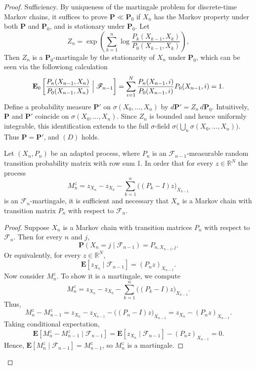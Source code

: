 \documentclass[10pt,a4paper]{amsart}
\begin{document}
\begin{proof} Sufficiency. By uniqueness of the martingale problem for discrete-time Markov chains, it suffices to prove $\mathbf P \ll \mathbf P_0$ if $X_n$ has the Markov property under both $\mathbf P$ and $\mathbf P_0$, and is stationary under $\mathbf P_0$.  Let 
\[Z_n = \exp\left(\sum_{k=1}^{n} \log \frac{P_{k}(X_{k-1},X_{k})}{P_{0}(X_{k-1},X_{k})}
    \right),\]
Then $Z_n$ is a $\mathbf P_0$-martingale by the stationarity of $X_n$ under $\mathbf P_0$, which can be seen via the followiong calculation
$$\mathbf E_{0}\left[\frac{P_{n}(X_{n-1},X_{n})}{P_{0}(X_{n-1},X_{n})}\Bigm|\mathscr F_{n-1}\right]   =\sum_{i=1}^N\frac{P_{n}(X_{n-1},i)}{P_{0}(X_{n-1},i)}P_0(X_{n-1},i)=1.   $$
Define a probability measure $\mathbf P'$ on $\sigma(X_0,\dots,X_n)$ by $d\mathbf P' = Z_n \, d\mathbf P_0$. Intuitively, $\mathbf P$ and $\mathbf P'$ coincide on $\sigma(X_{0},\dots,X_{n})$. Since $Z_n$ is bounded and hence uniformly integrable, this identification extends to the full $\sigma$-field $\sigma\big(\bigcup_n \sigma(X_{0},\dots,X_{n})\big)$. Thus $\mathbf P = \mathbf P'$, and $(D)$ holds.

    \begin{lemma}
        Let $(X_n, P_n)$ be an adapted process, where $P_n$ is an $\mathscr F_{n-1}$-measurable random transition probability matrix with row sum 1. In order that for every $z \in \mathbb R^N$ the process
        \begin{equation}
            M_n^z = z_{X_n} - z_{X_0} - \sum_{k=1}^{n} \big( (P_k - I)z\big)_{X_{k-1}}
            \label{eq: Markov martingale}
        \end{equation}
        is an  $\mathscr F_n$-martingale, it is sufficient and necessary that $X_n$ is a Markov chain with transition matrix $P_n$ with respect to $\mathscr F_n$. 
        \end{lemma}
    \begin{proof} Suppose $X_n$ is a Markov chain with transition matrices $P_n$ with respect to $\mathscr F_n$. Then for every $n$ and $j$,
    $$\mathbf P(X_{n} = j \mid \mathscr F_{n-1}) = P_{n, X_{n-1}, j}.$$
    Or equivalently, for every $z \in \mathbb R^N$,
    $$\mathbf E[z_{X_{n}} \mid \mathscr F_{n-1}] = (P_{n} z)_{X_{n-1}}.$$
    Now consider $M_n^z$. To show it is a martingale, we compute
    $$M_{n}^z = z_{X_{n}} - z_{X_0} - \sum_{k=1}^{n} \big( (P_k-I) z\big)_{X_{k-1}}.$$
    Thus,
    $$M_{n}^z - M_{n-1}^z = z_{X_{n}} - z_{X_{n-1}} -\big( (P_{n}-I) z\big)_{X_{n-1}} = z_{X_{n}} - (P_{n} z)_{X_{n-1}}.$$
    Taking conditional expectation,
    $$\mathbf E[M_{n}^z - M_{n-1}^z \mid \mathscr F_{n-1}] = \mathbf E[z_{X_{n}} \mid \mathscr F_{n-1}] - (P_{n} z)_{X_{n-1}} = 0.$$
    Hence, $\mathbf E[M_{n}^z \mid \mathscr F_{n-1}] = M_{n-1}^z$, so $M_n^z$ is a martingale.


\end{proof}
\end{proof}
\end{document}
